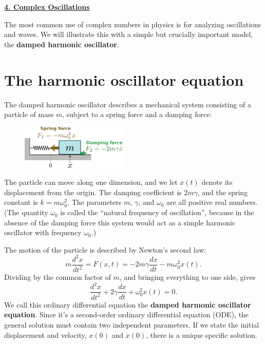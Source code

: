 \documentclass[10pt,a4paper]{article}
\begin{document}
\setcounter{page}{28}
\noindent
\underline{\textbf{\LARGE 4. Complex Oscillations}}
\vskip 0.1in

The most common use of complex numbers in physics is for analyzing
oscillations and waves. We will illustrate this with a simple but
crucially important model, the \textbf{damped harmonic oscillator}.

\section{The harmonic oscillator equation}
\label{the-harmonic-oscillator-equation}

The damped harmonic oscillator describes a mechanical system consisting
of a particle of mass $m$, subject to a spring force and a damping
force:

\begin{figure}[h]
  \centering\includegraphics[width=0.45\textwidth]{oscillator}
\end{figure}
\noindent
The particle can move along one dimension, and we let $x(t)$ denote
its displacement from the origin. The damping coefficient is $2m
\gamma$, and the spring constant is $k = m\omega_0^2$. The parameters
$m$, $\gamma$, and $\omega_0$ are all positive real numbers. (The
quantity $\omega_0$ is called the ``natural frequency of
oscillation'', because in the absence of the damping force this system
would act as a simple harmonic oscillator with frequency $\omega_0$.)

The motion of the particle is described by Newton's second law:
\begin{equation}
  m \frac{d^2 x}{dt^2} = F(x,t) = - 2m\gamma \frac{dx}{dt} - m\omega_0^2 x(t).
\end{equation}
Dividing by the common factor of $m$, and bringing everything to one
side, gives
\begin{equation}
  \frac{d^2 x}{dt^2} + 2\gamma \frac{dx}{dt} + \omega_0^2 x(t) = 0.
\end{equation}
We call this ordinary differential equation the \textbf{damped
  harmonic oscillator equation}. Since it's a second-order ordinary
differential equation (ODE), the general solution must contain two
independent parameters. If we state the initial displacement and
velocity, $x(0)$ and $\dot{x}(0)$, there is a unique specific
solution.
\end{document}
